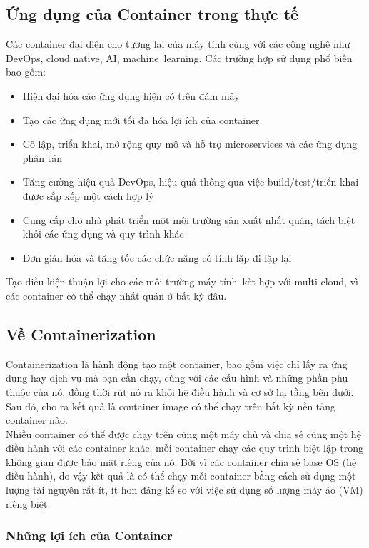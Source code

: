 \documentclass[14pt,a4paper]{book}
\begin{document}
		\subsection{Ứng dụng của Container trong thực tế}
		\hspace{0.6cm}Các container đại diện cho tương lai của máy tính cùng với các công nghệ như DevOps, cloud native, AI, machine learning. Các trường hợp sử dụng phổ biến bao gồm:
		\begin{itemize}
		\item Hiện đại hóa các ứng dụng hiện có trên đám mây
		\item Tạo các ứng dụng mới tối đa hóa lợi ích của container
		\item Cô lập, triển khai, mở rộng quy mô và hỗ trợ microservices và các ứng dụng phân tán
		\item Tăng cường hiệu quả DevOps, hiệu quả thông qua việc build/test/triển khai được sắp xếp một cách hợp lý
		\item Cung cấp cho nhà phát triển một môi trường sản xuất nhất quán, tách biệt khỏi các ứng dụng và quy trình khác
		\item Đơn giản hóa và tăng tốc các chức năng có tính lặp đi lặp lại\\
		\end{itemize}
		
		Tạo điều kiện thuận lợi cho các môi trường máy tính kết hợp với multi-cloud, vì các container có thể chạy nhất quán ở bất kỳ đâu.
		\subsection{Về Containerization}
		\hspace{0.6cm}Containerization là hành động tạo một container, bao gồm việc chỉ lấy ra ứng dụng hay dịch vụ mà bạn cần chạy, cùng với các cấu hình và những phần phụ thuộc của nó, đồng thời rút nó ra khỏi hệ điều hành và cơ sở hạ tầng bên dưới. Sau đó, cho ra kết quả là container image có thể chạy trên bất kỳ nền tảng container nào.\\
		
		Nhiều container có thể được chạy trên cùng một máy chủ và chia sẻ cùng một hệ điều hành với các container khác, mỗi container chạy các quy trình biệt lập trong không gian được bảo mật riêng của nó. Bởi vì các container chia sẻ base OS (hệ điều hành), do vậy kết quả là có thể chạy mỗi container bằng cách sử dụng một lượng tài nguyên rất ít, ít hơn đáng kể so với việc sử dụng số lượng máy ảo (VM) riêng biệt.
			\subsubsection{Những lợi ích của Container}
\end{document}
